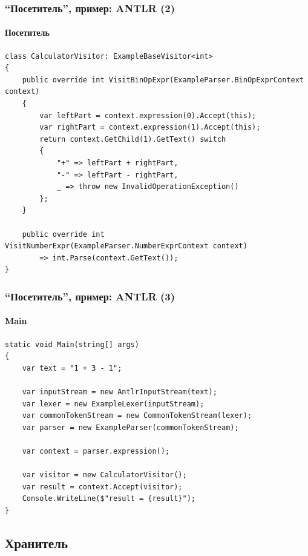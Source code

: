 \documentclass[xetex,mathserif,serif]{beamer}
\begin{document}
    \begin{frame}[fragile]
        \frametitle{``Посетитель'', пример: ANTLR (2)}
        \framesubtitle{Посетитель}
        \begin{footnotesize}
            \begin{verbatim}
class CalculatorVisitor: ExampleBaseVisitor<int>
{
    public override int VisitBinOpExpr(ExampleParser.BinOpExprContext context)
    {
        var leftPart = context.expression(0).Accept(this);
        var rightPart = context.expression(1).Accept(this);
        return context.GetChild(1).GetText() switch
        {
            "+" => leftPart + rightPart,
            "-" => leftPart - rightPart,
            _ => throw new InvalidOperationException()
        };
    }

    public override int VisitNumberExpr(ExampleParser.NumberExprContext context)
        => int.Parse(context.GetText());
}
            \end{verbatim}
        \end{footnotesize}
    \end{frame}

    \begin{frame}[fragile]
        \frametitle{``Посетитель'', пример: ANTLR (3)}
        \framesubtitle{Main}
        \begin{small}
            \begin{verbatim}
static void Main(string[] args)
{
    var text = "1 + 3 - 1";

    var inputStream = new AntlrInputStream(text);
    var lexer = new ExampleLexer(inputStream);
    var commonTokenStream = new CommonTokenStream(lexer);
    var parser = new ExampleParser(commonTokenStream);

    var context = parser.expression();

    var visitor = new CalculatorVisitor();
    var result = context.Accept(visitor);
    Console.WriteLine($"result = {result}");
}
            \end{verbatim}
        \end{small}
    \end{frame}

    \subsection{Хранитель}
\end{document}
